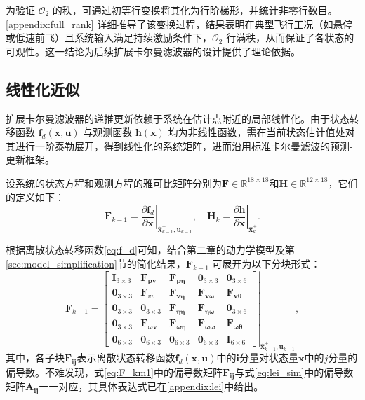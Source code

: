 为验证 $\mathcal{O}_2$ 的秩，可通过初等行变换将其化为行阶梯形，并统计非零行数目。\ref{appendix:full_rank} 详细推导了该变换过程，结果表明在典型飞行工况（如悬停或低速前飞）且系统输入满足持续激励条件下，$\mathcal{O}_2$ 行满秩，从而保证了各状态的可观性。这一结论为后续扩展卡尔曼滤波器的设计提供了理论依据。

\subsection{线性化近似} %
扩展卡尔曼滤波器的递推更新依赖于系统在估计点附近的局部线性化。由于状态转移函数 $\bm{f}_d(\bm{x}, \bm{u})$ 与观测函数 $\bm{h}(\bm{x})$ 均为非线性函数，需在当前状态估计值处对其进行一阶泰勒展开，得到线性化的系统矩阵，进而沿用标准卡尔曼滤波的预测-更新框架。

设系统的状态方程和观测方程的雅可比矩阵分别为$\bm{F} \in \mathbb{R}^{18 \times 18}$和$\bm{H} \in \mathbb{R}^{12 \times 18}$，它们的定义如下：
\begin{equation}
    \bm{F}_{k-1} = \left. \frac{\partial \bm{f}_d}{\partial \bm{x}} \right|_{\hat{\bm{x}}_{k-1}^+, \bm{u}_{k-1}}, \quad \bm{H}_{k} = \left. \frac{\partial \bm{h}}{\partial \bm{x}} \right|_{\hat{\bm{x}}_{k}^+}.
\end{equation}

根据离散状态转移函数\ref{eq:f_d}可知，结合第二章的动力学模型及第\ref{sec:model_simplification}节的简化结果，$\bm{F}_{k-1}$ 可展开为以下分块形式：
\begin{equation}
    \bm{F}_{k-1} = 
    \left.\begin{bmatrix}
        \bm{I}_{3 \times 3} & \bm{F}_{\bm{p} \bm{v}} & \bm{F}_{\bm{p} \bm{\eta}} & \bm{0}_{3 \times 3} & \bm{0}_{3 \times 6} \\
        \bm{0}_{3 \times 3} & \bm{F}_{v v} & \bm{F}_{\bm{v \eta}} & \bm{F}_{\bm{v \omega}} & \bm{F}_{\bm{v \theta}} \\
        \bm{0}_{3 \times 3} & \bm{0}_{3 \times 3} & \bm{F}_{\bm{\eta \eta}} & \bm{F}_{\bm{\eta \omega}} & \bm{0}_{3 \times 6} \\
        \bm{0}_{3 \times 3} & \bm{F}_{\bm{\omega v}} & \bm{F}_{\bm{\omega \eta}} & \bm{F}_{\bm{\omega \omega}} & \bm{F}_{\bm{\omega \theta}} \\
        \bm{0}_{6 \times 3} & \bm{0}_{6 \times 3} & \bm{0}_{6 \times 3} & \bm{0}_{6 \times 3} & \bm{I}_{6 \times 6}
    \end{bmatrix}\right|_{\hat{\bm{x}}_{k-1}^+, \bm{u}_{k-1}},
    \label{eq:F_km1}
\end{equation}
其中，各子块$\bm{F}_{\bm{ij}}$表示离散状态转移函数$\bm{f}_d(\bm{x},\bm{u})$中的$\bm{i}$分量对状态量$\bm{x}$中的$j$分量的偏导数。不难发现，式\eqref{eq:F_km1}中的偏导数矩阵$\bm{F}_{\bm{ij}}$与式\eqref{eq:lei_sim}中的偏导数矩阵$\bm{A}_{\bm{ij}}$一一对应，其具体表达式已在\ref{appendix:lei}中给出。

